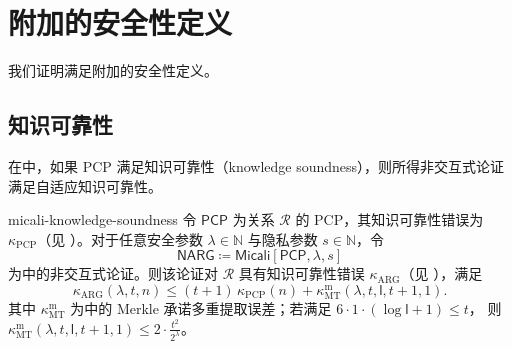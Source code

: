 \documentclass[american,singlepageview]{snargs-book-zh}
\newcommand{\DefineEqual}{\coloneqq}
\newcommand{\Naturals}{\mathbb{N}}
\newcommand{\Relation}{\mathcal{R}}
\newcommand{\InstanceSize}{n}
\newcommand{\ProtoKnowledgeError}{\kappa}
\newcommand{\ProtoProofLength}{\mathsf{l}}
\newcommand{\PCPSymbol}{\mathsf{PCP}}
\newcommand{\PCPSubscript}{\scriptscriptstyle\mathrm{PCP}}
\newcommand{\PCPKnowledgeError}{\ProtoKnowledgeError_{\PCPSubscript}}
\newcommand{\PCPProofLength}{\ProtoProofLength}
\newcommand{\NARGSymbol}{\mathsf{NARG}}
\newcommand{\ARGSubscript}{\scriptscriptstyle\mathrm{ARG}}
\newcommand{\ARGKnowledgeError}{\ProtoKnowledgeError_{\ARGSubscript}}
\newcommand{\ROQueryBound}{t}
\newcommand{\SecurityParameter}{\lambda}
\newcommand{\PrivacyParameter}{s}
\newcommand{\MTSubscript}{{\scriptscriptstyle\mathrm{MT}}}
\newcommand{\MTMultiSymbol}{\scriptscriptstyle{\mathrm{m}}}
\newcommand{\MTMultiExtractionError}{\ProtoKnowledgeError_{\MTSubscript}^{\MTMultiSymbol}}
\newcommand{\FormatTransName}[1]{\bm{\mathsf{#1}}}
\newcommand{\MicaliSymbol}{\FormatTransName{Micali}}
\newcommand{\FormatTransInputs}[3]{[#1,#2,#3]}
\newcommand{\MicaliTransformation}[3]{\MicaliSymbol\FormatTransInputs{#1}{#2}{#3}}
\newcommand{\MTMultiExtractabilityShortExpression}[2]{2 \cdot \frac{#2^2}{2^{#1}}}
\newcommand{\MTMultiExtractabilityCondition}[3]{6 \cdot #2 \cdot (#3+1) \leq #1}
\begin{document}
\chapter{附加的安全性定义}
\label{chapter:micali-additional}

我们证明满足附加的安全性定义。

\section{知识可靠性}
\label{section:micali-knowledge-soundness}

在中，如果 PCP 满足知识可靠性（knowledge soundness），则所得非交互式论证满足自适应知识可靠性。

\begin{ImportantTheorem}{}{micali-knowledge-soundness}
令 $\PCPSymbol$ 为关系 $\Relation$ 的 PCP，其知识可靠性错误为 $\PCPKnowledgeError$（见 ）。对于任意安全参数 $\SecurityParameter\in\Naturals$ 与隐私参数 $\PrivacyParameter\in\Naturals$，令
\[
  \NARGSymbol\DefineEqual\MicaliTransformation{\PCPSymbol}{\SecurityParameter}{\PrivacyParameter}
\]
为中的非交互式论证。则该论证对 $\Relation$ 具有知识可靠性错误 $\ARGKnowledgeError$（见 ），满足
\[
  \ARGKnowledgeError(\SecurityParameter,\ROQueryBound,\InstanceSize)
  \le
  (\ROQueryBound+1)\,\PCPKnowledgeError(\InstanceSize)
  +
  \MTMultiExtractionError(\SecurityParameter,\ROQueryBound,\PCPProofLength,\ROQueryBound+1,1).
\]
其中 $\MTMultiExtractionError$ 为中的 Merkle 承诺多重提取误差；若满足
$\MTMultiExtractabilityCondition{\ROQueryBound}{1}{\log\PCPProofLength}$，
则
$\MTMultiExtractionError(\SecurityParameter,\ROQueryBound,\PCPProofLength,\ROQueryBound+1,1)
\le \MTMultiExtractabilityShortExpression{\SecurityParameter}{\ROQueryBound}$。
\end{ImportantTheorem}
\end{document}
